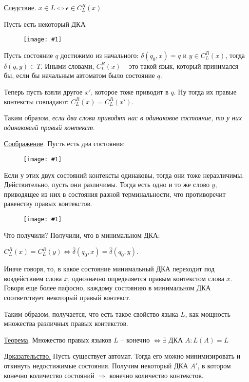 \documentclass[fleqn, 12pt]{article}
\newcommand{\image}[2] { \begin{figure}[h!] \centering	\texttt{[image: \#1]}  \end{figure} }
\begin{document}
\underline{Следствие.} $ x \in L \Leftrightarrow \epsilon \in C_L^R(x) $

Пусть есть некоторый ДКА

\image{img1.png}{0.5}

Пусть состояние $ q $ достижимо из начального: $ \delta (q_0, x) = q $ и $ y \in C_L^R(x) $, тогда $ \delta(q, y) \in T $. Иными словами, $ C_L^R(x) $ -- это такой язык, который принимался бы, если бы начальным автоматом было состояние $ q $. 

Теперь пусть взяли другое $ x' $, которое тоже приводит в $ q $. Ну тогда их правые контексты совпадают: $ C_L^R(x) = C_L^R(x') $.

Таким образом, \textit{если два слова приводят нас в одинаковое состояние, то у них одинаковый правый контекст}.

\bigskip

\underline{Соображение}. Пусть есть два состояния: 

\image{img2}{0.5}

Если у этих двух состояний контексты одинаковы, тогда они тоже неразличимы. Действительно, пусть они различимы. Тогда есть одно и то же слово $ y $, приводящее из них в состояния разной терминальности, что противоречит равенству правых контекстов.

\image{img3}{0.5}

\bigskip

Что получили? Получили, что в минимальном ДКА:

$ C_L^R(x) = C_L^R(y) \Leftrightarrow \hat{\delta}(q_0, x) = \hat{\delta}(q_0, y) $. 

Иначе говоря, то, в какое состояние минимальный ДКА переходит под воздействием слова $ x $, однозначно определяется правым контекстом слова $ x $. Говоря еще более пафосно, каждому состоянию в минимальном ДКА соответствует некоторый правый контекст.

Таким образом, получается, что есть такое свойство языка $ L $, как мощность множества различных правых контекстов.

\bigskip

\underline{Теорема}. Множество правых языков $ L $ -- конечно $ \Leftrightarrow \exists $ ДКА $ A \colon  L(A) = L $

\underline{Доказательство.} Пусть существует автомат. Тогда его можно минимизировать и откинуть недостижимые состояния. Получим некоторый ДКА $ A' $, в котором конечно количество состояний $ \Rightarrow $ конечно количество контекстов.
\end{document}
